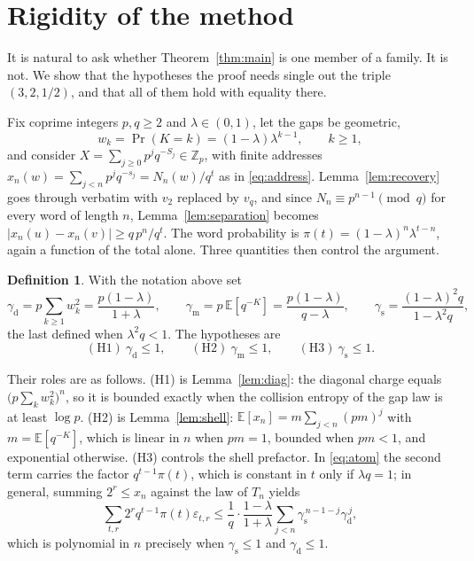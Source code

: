 \documentclass[11pt,reqno]{amsart}
\theoremstyle{plain}
\theoremstyle{definition}
\newtheorem{definition}[theorem]{Definition}
\theoremstyle{remark}
\newcommand{\Zp}{\mathbb{Z}_p}
\newcommand{\E}{\mathbb{E}}
\newcommand{\Prob}{\operatorname{Pr}}
\begin{document}
\section{Rigidity of the method}\label{sec:rigidity}

It is natural to ask whether Theorem~\ref{thm:main} is one member of a
family. It is not. We show that the hypotheses the proof needs single out
the triple $(3,2,1/2)$, and that all of them hold with equality there.

Fix coprime integers $p,q\ge2$ and $\lambda\in(0,1)$, let the gaps be
geometric,
\begin{equation}
w_k=\Prob(K=k)=(1-\lambda)\lambda^{k-1},\qquad k\ge1,
\label{eq:geomgap}
\end{equation}
and consider $X=\sum_{j\ge0}p^jq^{-S_j}\in\Zp$, with finite addresses
$x_n(w)=\sum_{j<n}p^jq^{-s_j}=N_n(w)/q^{t}$ as in \eqref{eq:address}.
Lemma~\ref{lem:recovery} goes through verbatim with $v_2$ replaced by
$v_q$, and since $N_n\equiv p^{n-1}\pmod q$ for every word of length $n$,
Lemma~\ref{lem:separation} becomes
$|x_n(u)-x_n(v)|\ge q\,p^n/q^{t}$. The word probability is
$\pi(t)=(1-\lambda)^n\lambda^{t-n}$, again a function of the total alone.
Three quantities then control the argument.

\begin{definition}\label{def:hyp}
With the notation above set
\[
\gamma_{\mathrm{d}}=p\sum_{k\ge1}w_k^2=\frac{p(1-\lambda)}{1+\lambda},
\qquad
\gamma_{\mathrm{m}}=p\,\E[q^{-K}]=\frac{p(1-\lambda)}{q-\lambda},
\qquad
\gamma_{\mathrm{s}}=\frac{(1-\lambda)^2q}{1-\lambda^2q},
\]
the last defined when $\lambda^2q<1$. The hypotheses are
\begin{equation}
\mathrm{(H1)}\ \gamma_{\mathrm{d}}\le1,
\qquad
\mathrm{(H2)}\ \gamma_{\mathrm{m}}\le1,
\qquad
\mathrm{(H3)}\ \gamma_{\mathrm{s}}\le1 .
\label{eq:H}
\end{equation}
\end{definition}

Their roles are as follows. \textup{(H1)} is Lemma~\ref{lem:diag}: the
diagonal charge equals $\bigl(p\sum_kw_k^2\bigr)^n$, so it is bounded
exactly when the collision entropy of the gap law is at least $\log p$.
\textup{(H2)} is Lemma~\ref{lem:shell}: $\E[x_n]=m\sum_{j<n}(pm)^j$ with
$m=\E[q^{-K}]$, which is linear in $n$ when $pm=1$, bounded when $pm<1$,
and exponential otherwise. \textup{(H3)} controls the shell prefactor. In
\eqref{eq:atom} the second term carries the factor $q^{t-1}\pi(t)$, which
is constant in $t$ only if $\lambda q=1$; in general, summing
$2^r\le x_n$ against the law of $T_n$ yields
\begin{equation}
\sum_{t,r}2^rq^{t-1}\pi(t)\varepsilon_{t,r}
\le\frac1q\cdot\frac{1-\lambda}{1+\lambda}
\sum_{j<n}\gamma_{\mathrm{s}}^{\,n-1-j}\gamma_{\mathrm{d}}^{\,j},
\label{eq:shellgeneral}
\end{equation}
which is polynomial in $n$ precisely when
$\gamma_{\mathrm{s}}\le1$ and $\gamma_{\mathrm{d}}\le1$.
\end{document}
